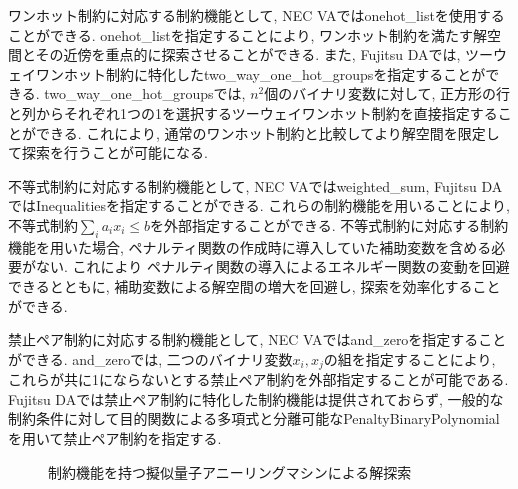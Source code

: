 \documentclass[submit,techrep,noauthor]{ipsj}
\begin{document}
ワンホット制約に対応する制約機能として, NEC VAではonehot\_listを使用することができる. onehot\_listを指定することにより, ワンホット制約を満たす解空間とその近傍を重点的に探索させることができる. また, Fujitsu DAでは, ツーウェイワンホット制約に特化したtwo\_way\_one\_hot\_groupsを指定することができる. two\_way\_one\_hot\_groupsでは, $n^{2}$個のバイナリ変数に対して, 正方形の行と列からそれぞれ1つの1を選択するツーウェイワンホット制約を直接指定することができる. これにより, 通常のワンホット制約と比較してより解空間を限定して探索を行うことが可能になる\cite{komatsu2}.

不等式制約に対応する制約機能として, NEC VAではweighted\_sum, Fujitsu DAではInequalitiesを指定することができる. これらの制約機能を用いることにより, 不等式制約$\sum_{i}a_{i}x_{i}\le b$を外部指定することができる. 不等式制約に対応する制約機能を用いた場合, ペナルティ関数の作成時に導入していた補助変数を含める必要がない. これにより ペナルティ関数の導入によるエネルギー関数の変動を回避できるとともに, 補助変数による解空間の増大を回避し, 探索を効率化することができる.

禁止ペア制約に対応する制約機能として, NEC VAではand\_zeroを指定することができる. and\_zeroでは, 二つのバイナリ変数$x_{i}, x_{j}$の組を指定することにより, これらが共に1にならないとする禁止ペア制約を外部指定することが可能である. Fujitsu DAでは禁止ペア制約に特化した制約機能は提供されておらず, 一般的な制約条件に対して目的関数による多項式と分離可能なPenaltyBinaryPolynomialを用いて禁止ペア制約を指定する.

\begin{figure}[tbp]
\centering
{}
\hspace{5mm}
\caption{制約機能を持つ擬似量子アニーリングマシンによる解探索}
\label{va_search}
\end{figure}
\end{document}
